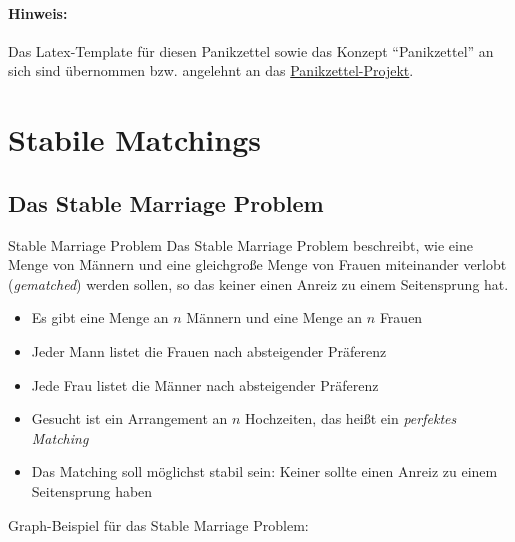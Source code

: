 \documentclass{panikzettel}
\begin{document}
\vspace{-0.5\baselineskip}
{\small{}
	\paragraph{Hinweis:}
	Das Latex-Template für diesen Panikzettel sowie das Konzept ``Panikzettel'' an sich sind übernommen bzw. angelehnt an das \href{https://git.rwth-aachen.de/philipp.schroer/panikzettel}{Panikzettel-Projekt}.

\section{Stabile Matchings}

\subsection{Das Stable Marriage Problem}

\begin{halfboxl}
	\vspace{-\baselineskip}
	\begin{defi}{Stable Marriage Problem}
	Das Stable Marriage Problem beschreibt, wie eine Menge von Männern und eine gleichgroße Menge von Frauen miteinander verlobt (\emph{gematched}) werden sollen, so das keiner einen Anreiz zu einem Seitensprung hat.\\
	
	\begin{itemize}
		\item Es gibt eine Menge an $n$ Männern und eine Menge an $n$ Frauen
		\item Jeder Mann listet die Frauen nach absteigender Präferenz
		\item Jede Frau listet die Männer nach absteigender Präferenz
		\item Gesucht ist ein Arrangement an $n$ Hochzeiten, das heißt ein \emph{perfektes Matching}
		\item Das Matching soll möglichst stabil sein: Keiner sollte einen Anreiz zu einem Seitensprung haben
	\end{itemize}
	\end{defi}
\end{halfboxl}%
\begin{halfboxr}
	 \vspace{-\baselineskip}
	Graph-Beispiel für das Stable Marriage Problem:\\
	
	\begin{center}
\end{center}
\end{halfboxr}}
\end{document}
